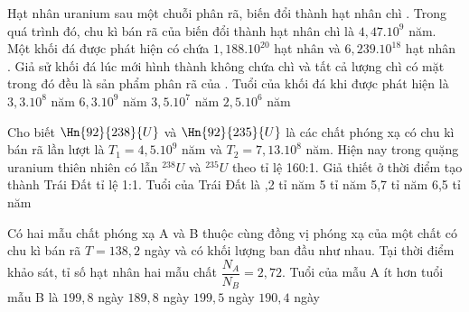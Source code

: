 \begin{vidu}%
	 Hạt nhân uranium  sau một chuỗi phân rã, biến đổi thành hạt nhân chì . Trong quá trình đó, chu kì bán rã của  biến đổi thành hạt nhân chì là $4,47.10^9$ năm. Một khối đá được phát hiện có chứa $1,188.10^{20}$ hạt nhân  và $6,239.10^{18}$ hạt nhân . Giả sử khối đá lúc mới hình thành không chứa chì và tất cả lượng chì có mặt trong đó đều là sản phẩm phân rã của . Tuổi của khối đá khi được phát hiện là
	\choice
	{\True $3,3.10^8$ năm}
	{$6,3.10^9$ năm}
	{$3,5.10^7$ năm}
	{$2,5.10^6$ năm}
\end{vidu}
\begin{vidu}%
	Cho biết $\Hn{92}{238}{U}$ và $\Hn{92}{235}{U}$ là các chất phóng xạ có chu kì bán rã lần lượt là $T_1 = 4,5.10^9$ năm và $T_2 = 7,13.10^8$ năm. Hiện nay trong quặng uranium thiên nhiên có lẫn $^{238}U$ và $^{235}U$ theo tỉ lệ 160:1. Giả thiết ở thời điểm tạo thành Trái Đất tỉ lệ 1:1. Tuổi của Trái Đất là
	\choice
	{,2 tỉ năm}
	{5 tỉ năm}
	{5,7 tỉ năm}
	{6,5 tỉ năm}
\end{vidu}
\begin{vidu}%
	Có hai mẫu chất phóng xạ A và B thuộc cùng đồng vị phóng xạ của một chất có chu kì bán rã $T = 138,2$ ngày và có khối lượng ban đầu như nhau. Tại thời điểm khảo sát, tỉ số hạt nhân hai mẫu chất $\dfrac{N_A}{N_B}=2,72$. Tuổi của mẫu A ít hơn tuổi mẫu B là
	\choice
	{$199,8$ ngày}
	{$189,8$ ngày}
	{\True $199,5$ ngày}
	{$190,4$ ngày}
\end{vidu}
